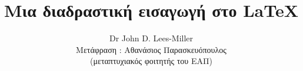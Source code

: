 \newenvironment{exampletwouptiny}
  {\VerbatimEnvironment
   \begin{VerbatimOut}{example.out}}
  {\end{VerbatimOut}
   \setlength{\parindent}{0pt}
   \fbox{\begin{tabular}{l|l}
   \begin{minipage}{0.55\linewidth}
     \inputminted[fontsize=\scriptsize,resetmargins]{latex}{example.out}
   \end{minipage} &
   \begin{minipage}{0.35\linewidth}
     \setlength{\parskip}{6pt plus 1pt minus 1pt}%
     \raggedright\scriptsize
   \end{minipage}
   \end{tabular}}}

\newenvironment{exampletwouptinynoframe}
  {\VerbatimEnvironment
   \begin{VerbatimOut}{example.out}}
  {\end{VerbatimOut}
   \setlength{\parindent}{0pt}
   \begin{tabular}{l|l}
   \begin{minipage}{0.55\linewidth}
     \inputminted[fontsize=\scriptsize,resetmargins]{latex}{example.out}
   \end{minipage} &
   \begin{minipage}{0.35\linewidth}
     \setlength{\parskip}{6pt plus 1pt minus 1pt}%
     \raggedright\scriptsize
   \end{minipage}
   \end{tabular}}

\title{ Μια διαδραστική εισαγωγή στο \LaTeX}

\author{\textlatin{Dr John D. Lees-Miller} \\ 
\small {Μετάφραση : Αθανάσιος Παρασκευόπουλος \\(μεταπτυχιακός φοιτητής του ΕΑΠ)}}

